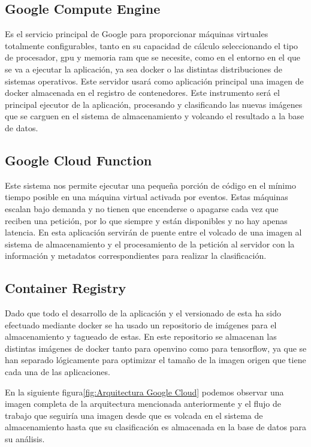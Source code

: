 \subsection{Google Compute Engine}\label{subsec:computeengine}
Es el servicio principal de Google para proporcionar máquinas virtuales totalmente configurables, tanto en su capacidad de cálculo seleccionando el tipo de procesador, gpu y memoria ram que se necesite, como en el entorno
en el que se va a ejecutar la aplicación, ya sea docker o las distintas distribuciones de sistemas operativos.
Este servidor usará como aplicación principal una imagen de docker almacenada en el registro de contenedores.
Este instrumento será el principal ejecutor de la aplicación, procesando y clasificando las nuevas imágenes que se carguen en el sistema de almacenamiento y volcando el resultado a la base de datos.

\subsection{Google Cloud Function}\label{subsec:cloudfunction}
Este sistema nos permite ejecutar una pequeña porción de código en el mínimo tiempo posible en una máquina virtual activada por eventos.
Estas máquinas escalan bajo demanda y no tienen que encenderse o apagarse cada vez que reciben una petición, por lo que siempre y están disponibles y no hay apenas latencia.
En esta aplicación servirán de puente entre el volcado de una imagen al sistema de almacenamiento y el procesamiento de la petición al servidor con la información y metadatos correspondientes para realizar
la clasificación.

\subsection{Container Registry}\label{subsec:container-registry}
Dado que todo el desarrollo de la aplicación y el versionado de esta ha sido efectuado mediante docker se ha usado
un repositorio de imágenes para el almacenamiento y tagueado de estas.
En este repositorio se almacenan las distintas imágenes de docker tanto para openvino como para tensorflow, ya que se han
separado lógicamente para optimizar el tamaño de la imagen origen que tiene cada una de las aplicaciones.


En la siguiente figura\ref{fig:Arquitectura Google Cloud} podemos observar una imagen completa de la arquitectura mencionada anteriormente y el flujo de trabajo
que seguiría una imagen desde que es volcada en el sistema de almacenamiento hasta que su clasificación es almacenada en la base de datos
para su análisis.

